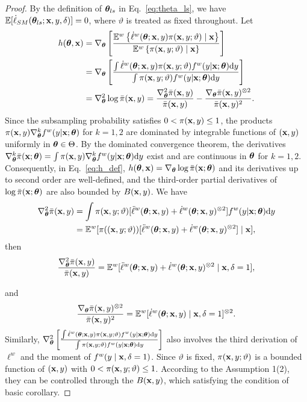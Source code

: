 \documentclass[12pt,hidelinks]{article}
\begin{document}
\begin{proof}
    By the definition of $\bm{\theta}_{ls}$ in Eq.~\eqref{eq:theta_ls}, we have 
$\mathbb{E}[\dot \ell_{SM}(\bm{\theta}_{ls};\mathbf{x},y,\delta)] = 0$, where $\vartheta$ is treated as fixed throughout.
    Let
\begin{align}\label{eq:h_def}
    h(\bm{\theta}, \mathbf{x}) 
    &= \nabla_{\bm{\theta}} \left[ \frac{\mathbb{E}^w \left\{
    \dot \ell^w(\bm{\theta}; \mathbf{x}, y) \pi(\mathbf{x}, y;\vartheta) 
    \mid \mathbf{x} \right\}}
    {\mathbb{E}^w \left\{\pi(\mathbf{x}, y;\vartheta) 
    \mid \mathbf{x} \right\} } \right] \notag \\
    &= \nabla_{\bm{\theta}} \left[ \frac{\int \dot \ell^w(\bm{\theta}; \mathbf{x}, y)
    \pi(\mathbf{x}, y;\vartheta) f^w(y|\mathbf{x};\bm{\theta}) \mathrm{d}y}
    {\int \pi(\mathbf{x}, y;\vartheta) f^w(y|\mathbf{x};\bm{\theta})\mathrm{d}y} \right] \notag \\
    &= \nabla_{\bm{\theta}}^2 \log \bar{\pi}(\mathbf{x}, y)
    = \frac{\nabla_{\bm{\theta}}^2 \bar{\pi}(\mathbf{x}, y)}{\bar{\pi}(\mathbf{x}, y)} - \frac{\nabla_{\bm{\theta}} \bar{\pi}(\mathbf{x}, y) ^{\otimes 2}}{\bar{\pi}(\mathbf{x}, y)^2}.
\end{align}
Since the subsampling probability satisfies $0 < \pi(\mathbf{x}, y) \leq 1$, the products $\pi(\mathbf{x}, y) \nabla^k_{\bm{\theta}} f^w(y|\mathbf{x};\bm{\theta})$ 
for $k = 1, 2$ are dominated by integrable functions of $(\mathbf{x}, y)$ uniformly in $\bm{\theta} \in \Theta$.
By the dominated convergence theorem, the derivatives $\nabla^k_{\bm{\theta}} \bar\pi(\mathbf{x};\bm{\theta}) = \int \pi(\mathbf{x}, y) \nabla^k_{\bm{\theta}} f^w(y|\mathbf{x};\bm{\theta}) \mathrm{d}y$ exist and are continuous in $\bm{\theta}$ for $k = 1, 2$.
Consequently, in Eq.~\ref{eq:h_def}, $h(\bm{\theta}, \mathbf{x}) = \nabla_{\bm{\theta}} \log \bar\pi(\mathbf{x};\bm{\theta})$ and its derivatives up to second order are well-defined, and the third-order partial derivatives of $\log\bar\pi(\mathbf{x};\bm{\theta})$ are also bounded by $B(\mathbf{x}, y)$.
We have
\begin{align*}
    \nabla_{\bm{\theta}}^2 \bar{\pi}(\mathbf{x}, y) &= \int \pi(\mathbf{x},y;\vartheta) [\ddot \ell^w(\bm{\theta}; \mathbf{x}, y) + \dot \ell^w(\bm{\theta}; \mathbf{x}, y)^{\otimes 2}] f^w(y|\mathbf{x};\bm{\theta}) \mathrm{d}y \notag \\
    &= \mathbb{E}^w[\pi((\mathbf{x}, y;\vartheta)) [\ddot \ell^w(\bm{\theta}; \mathbf{x}, y) + \dot \ell^w(\bm{\theta}; \mathbf{x}, y)^{\otimes 2}] \mid \mathbf{x}],
\end{align*}
then 
\begin{equation*}
    \frac{\nabla_{\bm{\theta}}^2 \bar{\pi}(\mathbf{x}, y)}{\bar{\pi}(\mathbf{x}, y)} = \mathbb{E}^w[\ddot \ell^w(\bm{\theta}; \mathbf{x}, y) + \dot \ell^w(\bm{\theta}; \mathbf{x}, y)^{\otimes 2} \mid \mathbf{x}, \delta=1],
\end{equation*}

and 
\begin{equation*}
    \frac{\nabla_{\bm{\theta}} \bar{\pi}(\mathbf{x}, y) ^{\otimes 2}}{\bar{\pi}(\mathbf{x}, y)^2} = \mathbb{E}^w[\dot \ell^w(\bm{\theta}; \mathbf{x}, y) \mid \mathbf{x}, \delta=1]^{\otimes 2} .
\end{equation*}
Similarly, $\nabla_{\bm{\theta}}^2 \left[ \frac{\int \dot \ell^w(\bm{\theta}; \mathbf{x}, y)\pi(\mathbf{x}, y;\vartheta) f^w(y|\mathbf{x};\bm{\theta}) \mathrm{d}y} {\int \pi(\mathbf{x}, y;\vartheta) f^w(y|\mathbf{x};\bm{\theta})\mathrm{d}y} \right]$ also involves the third derivation of $\ell^w$ and the moment of $f^w(y \mid \mathbf{x}, \delta=1)$. 
Since $\vartheta$ is fixed, $\pi(\mathbf{x},y;\vartheta)$ is a bounded 
function of $(\mathbf{x},y)$ with $0 < \pi(\mathbf{x},y;\vartheta) \leq 1$.
According to the Assumption 1(2), they can be controlled through the $B(\mathbf{x}, y)$, which satisfying the condition of basic corollary.

\end{proof}
\end{document}
